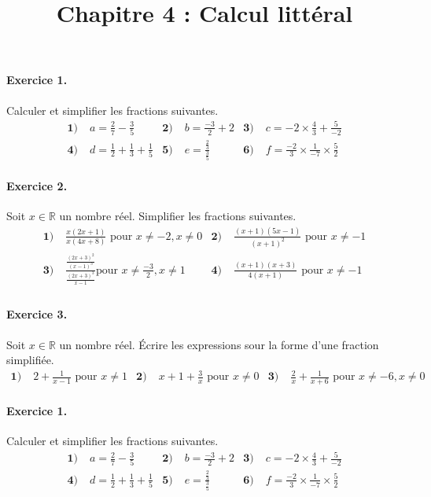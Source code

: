 \documentclass[11pt]{article}
\title{Chapitre 4 : Calcul littéral}
\date{}
\author{}
\begin{document}

\paragraph{Exercice 1.} Calculer et simplifier les fractions suivantes.
\begin{align*}
  \textbf{1)}\;& a=\frac{2}{7}-\frac{3}{5} &
  \textbf{2)}\;& b=\frac{-3}{2}+2 &
  \textbf{3)}\;& c=-2\times\frac{4}{3}+\frac{5}{-2} \\
  \textbf{4)}\;& d=\frac{1}{2}+\frac{1}{3}+\frac{1}{5} &
  \textbf{5)}\;& e= \frac{\frac{2}{3}}{\frac{3}{5}} &
  \textbf{6)}\;& f= \frac{-2}{3}\times\frac{1}{-7}\times\frac{5}{2}
\end{align*}

\paragraph{Exercice 2.} Soit $x\in\mathbb{R}$ un nombre réel. Simplifier 
les fractions suivantes.
\begin{align*}
  \textbf{1)}\;& \frac{x(2x+1)}{x(4x+8)}\text{ pour } x\neq-2, x\neq0 &
  \textbf{2)}\;& \frac{(x+1)(5x-1)}{(x+1)^2}\text{ pour } x\neq-1 \\
  \textbf{3)}\;& \frac{\frac{(2x+3)^2}{(x-1)^3}}{\frac{(2x+3)^3}{x-1}}\text{
  pour } x\neq\frac{-3}{2}, x\neq1 &
  \textbf{4)}\;& \frac{(x+1)(x+3)}{4(x+1)}\text{ pour } x\neq-1 \\
\end{align*}

\paragraph{Exercice 3.} Soit $x\in\mathbb{R}$ un nombre réel. Écrire les
expressions sour la forme d'une fraction simplifiée.
\begin{align*}
  \textbf{1)}\; & 2+\frac{1}{x-1}\text{ pour }x\neq1 &
  \textbf{2)}\; & x+1+\frac{3}{x}\text{ pour }x\neq0 &
  \textbf{3)}\; & \frac{2}{x}+\frac{1}{x+6}\text{ pour }x\neq-6, x\neq0 &
\end{align*}

\paragraph{Exercice 1.} Calculer et simplifier les fractions suivantes.
\begin{align*}
  \textbf{1)}\;& a=\frac{2}{7}-\frac{3}{5} &
  \textbf{2)}\;& b=\frac{-3}{2}+2 &
  \textbf{3)}\;& c=-2\times\frac{4}{3}+\frac{5}{-2} \\
  \textbf{4)}\;& d=\frac{1}{2}+\frac{1}{3}+\frac{1}{5} &
  \textbf{5)}\;& e= \frac{\frac{2}{3}}{\frac{3}{5}} &
  \textbf{6)}\;& f= \frac{-2}{3}\times\frac{1}{-7}\times\frac{5}{2}
\end{align*}
\end{document}

